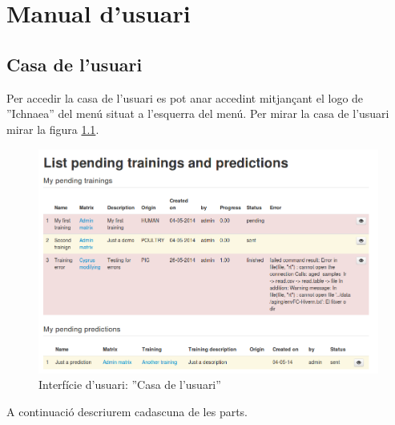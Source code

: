 \chapter{Manual d'usuari}
\label{cha:userguide}

\section{Casa de l'usuari}
\label{sec:home}
Per accedir la casa de l'usuari es pot anar accedint mitjançant el logo de ''Ichnaea'' del menú situat a l'esquerra del menú. Per mirar la casa de l'usuari mirar la figura \ref{fig:dashboard}.

\begin{figure}[h!]
  \centering
  \includegraphics[scale=0.4]{img/userguide/dashboard.png}
  \caption{Interfície d'usuari: ''Casa de l'usuari''}
  \label{fig:dashboard}
\end{figure}
A continuaci\'{o} descriurem cadascuna de les parts.

